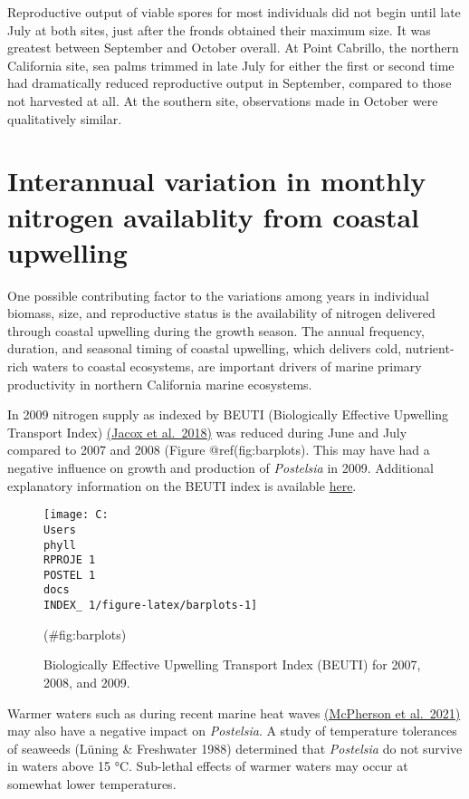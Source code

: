 \documentclass[
]{article}
\begin{document}
Reproductive output of viable spores for most individuals did not begin until late July at both sites, just after the fronds obtained their maximum size. It was greatest between September and October overall. At Point Cabrillo, the northern California site, sea palms trimmed in late July for either the first or second time had dramatically reduced reproductive output in September, compared to those not harvested at all. At the southern site, observations made in October were qualitatively similar.

\newpage

\hypertarget{interannual-variation-in-monthly-nitrogen-availablity-from-coastal-upwelling}{%
\section{Interannual variation in monthly nitrogen availablity from coastal upwelling}\label{interannual-variation-in-monthly-nitrogen-availablity-from-coastal-upwelling}}

One possible contributing factor to the variations among years in individual biomass, size, and reproductive status is the availability of nitrogen delivered through coastal upwelling during the growth season. The annual frequency, duration, and seasonal timing of coastal upwelling, which delivers cold, nutrient-rich waters to coastal ecosystems, are important drivers of marine primary productivity in northern California marine ecosystems.

In 2009 nitrogen supply as indexed by BEUTI (Biologically Effective Upwelling Transport Index) \href{https://agupubs.onlinelibrary.wiley.com/doi/full/10.1029/2018JC014187}{(Jacox et al.~2018)} was reduced during June and July compared to 2007 and 2008 (Figure @ref(fig:barplots). This may have had a negative influence on growth and production of \emph{Postelsia} in 2009. Additional explanatory information on the BEUTI index is available \href{https://mjacox.com/upwelling-indices/}{here}.

\begin{figure}

\texttt{[image: C:\\Users\\phyll\\RPROJE~1\\POSTEL~1\\docs\\INDEX\_~1/figure-latex/barplots-1]} \hfill{}

\caption{Biologically Effective Upwelling Transport Index (BEUTI) for 2007, 2008, and 2009.}(\#fig:barplots)
\end{figure}

Warmer waters such as during recent marine heat waves \href{https://www.nature.com/articles/s42003-021-01827-6}{(McPherson et al.~2021)} may also have a negative impact on \emph{Postelsia}. A study of temperature tolerances of seaweeds (Lüning \& Freshwater 1988) determined that \emph{Postelsia} do not survive in waters above 15 °C. Sub-lethal effects of warmer waters may occur at somewhat lower temperatures.
\end{document}
